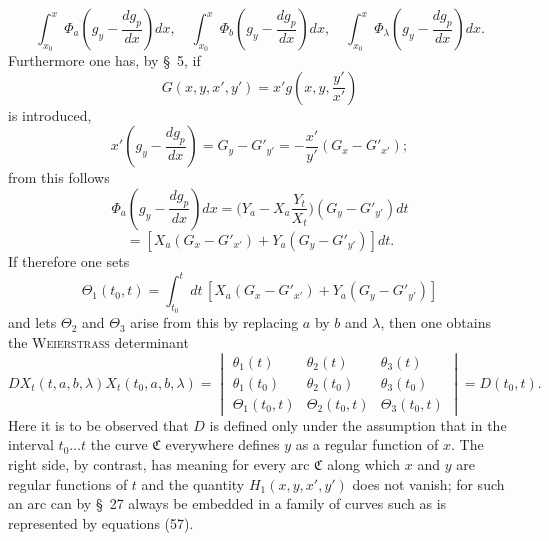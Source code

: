 \documentclass[11pt,a4paper,leqno]{article}
\begin{document}
\[
\int_{x_0}^{x}\Phi_a\left(g_y-\frac{dg_p}{dx}\right)dx,
\quad
\int_{x_0}^{x}\Phi_b\left(g_y-\frac{dg_p}{dx}\right)dx,
\quad
\int_{x_0}^{x}\Phi_\lambda\left(g_y-\frac{dg_p}{dx}\right)dx.
\]
Furthermore one has, by \S~5, if
\[
G(x,y,x',y')=x'g\left(x,y,\frac{y'}{x'}\right)
\]
is introduced,
\[
x'\left(g_y-\frac{dg_p}{dx}\right)=G_y-G'_{y'}=-\frac{x'}{y'}(G_x-G'_{x'});
\]
from this follows
\[
\Phi_a\left(g_y-\frac{dg_p}{dx}\right)dx=\biggl(Y_a-X_a\frac{Y_t}{X_t}\biggr)(G_y-G'_{y'})dt
\]
\[
=[X_a(G_x-G'_{x'})+Y_a(G_y-G'_{y'})]dt.
\]
If therefore one sets
\[
\Theta_1(t_0,t)=\int_{t_0}^{t}dt\,[X_a(G_x-G'_{x'})+Y_a(G_y-G'_{y'})]
\]
and lets $\Theta_2$ and $\Theta_3$ arise from this by replacing $a$ by $b$ and $\lambda$, then one obtains the \textsc{Weierstrass} determinant
\[
D X_t(t,a,b,\lambda)X_t(t_0,a,b,\lambda)=
\begin{vmatrix}
\theta_1(t)&\theta_2(t)&\theta_3(t)\\
\theta_1(t_0)&\theta_2(t_0)&\theta_3(t_0)\\
\Theta_1(t_0,t)&\Theta_2(t_0,t)&\Theta_3(t_0,t)
\end{vmatrix}=D(t_0,t).
\]
Here it is to be observed that $D$ is defined only under the assumption that in the interval $t_0\ldots t$ the curve $\mathfrak{C}$ everywhere defines $y$ as a regular function of $x$. The right side, by contrast, has meaning for every arc $\mathfrak{C}$ along which $x$ and $y$ are regular functions of $t$ and the quantity $H_1(x,y,x',y')$ does not vanish; for such an arc can by \S~27 always be embedded in a family of curves such as is represented by equations (57).
\end{document}
